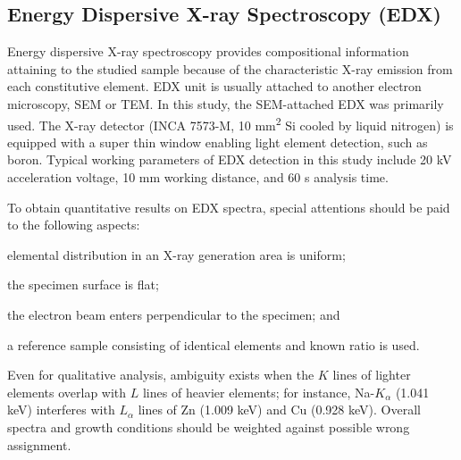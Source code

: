 \subsection{Energy Dispersive X-ray Spectroscopy (EDX)}\label{sec:edx}

Energy dispersive X-ray spectroscopy provides compositional information attaining to the studied sample because of the characteristic X-ray emission from each constitutive element. EDX unit is usually attached to another electron microscopy, SEM or TEM. In this study, the SEM-attached EDX was primarily used. The X-ray detector (INCA 7573-M, 10 \si{mm^2} Si cooled by liquid nitrogen) is equipped with a super thin window enabling light element detection, such as boron. Typical working parameters of EDX detection in this study include 20 kV acceleration voltage, 10 mm working distance, and 60 s analysis time.

To obtain quantitative results on EDX spectra, special attentions should be paid to the following aspects:
\begin{enumerate*}[label=\itshape\alph*\upshape)]
\item elemental distribution in an X-ray generation area is uniform;
\item the specimen surface is flat;
\item the electron beam enters perpendicular to the specimen; and
\item a reference sample consisting of identical elements and known ratio is used. 
\end{enumerate*} Even for qualitative analysis, ambiguity exists when the $K$ lines of lighter elements overlap with $L$ lines of heavier elements; for instance, Na-$K_\alpha$ (1.041 keV) interferes with $L_\alpha$ lines of Zn (1.009 keV) and Cu (0.928 keV). Overall spectra and growth conditions should be weighted against possible wrong assignment. 

